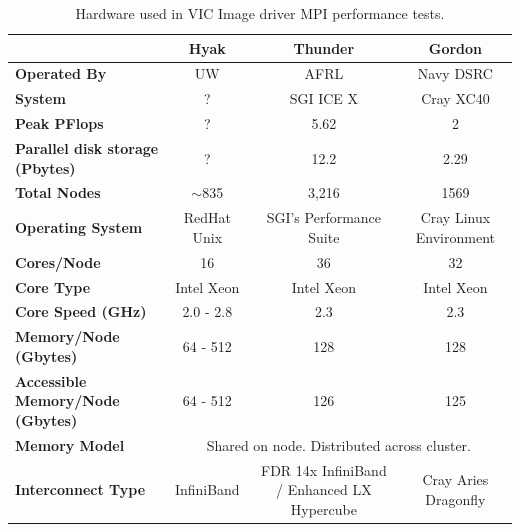 \documentclass[gmd, manuscript]{copernicus}
\begin{document}
\clearpage
\begin{table}[]
\centering
\caption{Hardware used in VIC Image driver MPI performance tests.}
\label{table:hardware}
\begin{tabular}{|l|c|c|c|}
\hline
                                         & \textbf{Hyak}                                & \textbf{Thunder}                           & \textbf{Gordon}        \\ \hline
\textbf{Operated By}                     & UW                                           & AFRL                                       & Navy DSRC              \\ \hline
\textbf{System}                          & ?                                            & SGI ICE X                                  & Cray XC40              \\ \hline
\textbf{Peak PFlops}                     & ?                                            & 5.62                                       & 2                      \\ \hline
\textbf{Parallel disk storage (Pbytes)}  & ?                                            & 12.2                                       & 2.29                   \\ \hline
\textbf{Total Nodes}                     & $\sim$835                                    & 3,216                                      & 1569                   \\ \hline
\textbf{Operating System}                & RedHat Unix                                  & SGI's Performance Suite                    & Cray Linux Environment \\ \hline
\textbf{Cores/Node}                      & 16                                           & 36                                         & 32                     \\ \hline
\textbf{Core Type}                       & Intel Xeon & Intel Xeon & Intel Xeon \\ \hline
\textbf{Core Speed (GHz)}                & 2.0 - 2.8                                    & 2.3                                        & 2.3                    \\ \hline
\textbf{Memory/Node (Gbytes)}            & 64 - 512                                     & 128                                        & 128                    \\ \hline
\textbf{Accessible Memory/Node (Gbytes)} & 64 - 512                                     & 126                                        & 125                    \\ \hline
\textbf{Memory Model}                    & \multicolumn{3}{c|}{Shared on node. Distributed across cluster.}                                                   \\ \hline
\textbf{Interconnect Type}               & InfiniBand                                   & FDR 14x InfiniBand / Enhanced LX Hypercube & Cray Aries  Dragonfly \\ \hline
\end{tabular}
\end{table}
\end{document}
